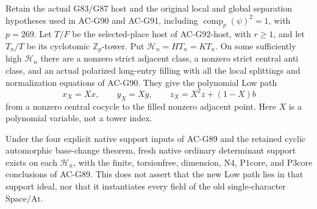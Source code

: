 \begin{corollary}
\label{AC-G93-fill}
Retain the actual G83/G87 host and the original local and global
separation hypotheses used in AC-G90 and AC-G91, including
\(\operatorname{comp}_p(\psi)^2=1\), with \(p=269\).
Let \(T/F\) be the selected-place host of AC-G92-host, with
\(r\geq1\), and let \(T_n/T\) be its cyclotomic
\(\mathbb Z_p\)-tower.  Put \(\mathcal H_n=HT_n=KT_n\).
On some sufficiently high \(\mathcal H_n\) there are a nonzero
strict adjacent class, a nonzero strict central anti class, and
an actual polarized long-entry filling with all the local
splittings and normalization equations of AC-G90.
They give the polynomial Low path
\[
 x_X=Xx,\qquad y_X=Xy,\qquad
 z_X=X^2z+(1-X)b
 \tag{G93.15}
\]
from a nonzero central cocycle to the filled nonzero adjacent
point.  Here \(X\) is a polynomial variable, not a tower index.

Under the four explicit native support inputs of AC-G89 and
the retained cyclic automorphic base-change theorem, fresh
native ordinary determinant support exists on each
\(\mathcal H_n\), with the finite, torsionfree, dimension,
\(\mathrm{N4}\), \(\mathrm{P1core}\), and \(\mathrm{P3core}\)
conclusions of AC-G89.  This does not assert that the new
Low path lies in that support ideal, nor that it instantiates
every field of the old single-character \(\mathrm{Space}/\mathrm{At}\).
\end{corollary}

